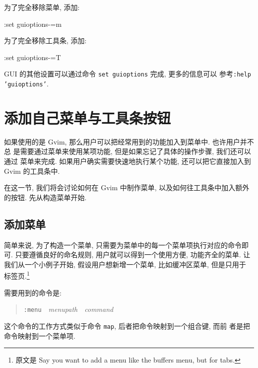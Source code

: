 为了完全移除菜单, 添加:
\begin{vimcmd}
:set guioptions-=m
\end{vimcmd}

为了完全移除工具条, 添加:
\begin{vimcmd}
:set guioptions-=T
\end{vimcmd}

\begin{warning}
    GUI 的其他设置可以通过命令 \texttt{set guioptions} 完成, 更多的信息可以
    参考\texttt{:help 'guioptions'}.
\end{warning}

\section{添加自己菜单与工具条按钮}
\label{sec:adding_your_own_menu_and_toolbar_buttons}
如果使用的是 Gvim, 那么用户可以把经常用到的功能加入到菜单中. 也许用户并不总
是需要通过菜单来使用某项功能, 但是如果忘记了具体的操作步骤, 我们还可以通过
菜单来完成. 如果用户确实需要快速地执行某个功能, 还可以把它直接加入到 Gvim
的工具条中.

在这一节, 我们将会讨论如何在 Gvim 中制作菜单, 以及如何往工具条中加入额外
的按钮. 先从构造菜单开始.

\subsection{添加菜单}
\label{subsec:adding_a_menu}
简单来说, 为了构造一个菜单, 只需要为菜单中的每一个菜单项执行对应的命令即可.
只要遵循良好的命名规则, 用户就可以得到一个使用方便, 功能齐全的菜单.
让我们从一个小例子开始, 假设用户想新增一个菜单, 比如缓冲区菜单, 但是只用于
标签页.\footnote{ 原文是 Say you want to add a menu like the buffers menu,
but for tabs.}

\begin{center}
\end{center}

需要用到的命令是:
\begin{quotation}
\texttt{:menu}\ \ \textit{menupath}\ \ \textit{command}
\end{quotation}
这个命令的工作方式类似于命令 \texttt{map}, 后者把命令映射到一个组合键, 而前
者是把命令映射到一个菜单项.

